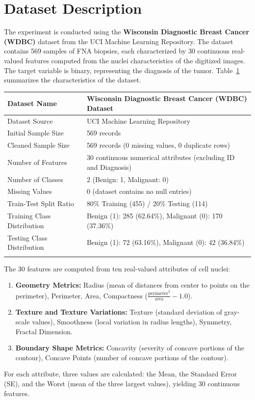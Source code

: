 \documentclass[12pt,a4paper]{article}
\begin{document}
\section{Dataset Description}
The experiment is conducted using the \textbf{Wisconsin Diagnostic Breast Cancer (WDBC)} dataset from the UCI Machine Learning Repository. The dataset contains 569 samples of FNA biopsies, each characterized by 30 continuous real-valued features computed from the nuclei characteristics of the digitized images. The target variable is binary, representing the diagnosis of the tumor. Table~\ref{tab:dataset_summary} summarizes the characteristics of the dataset.

\begin{longtable}{|p{6cm}|p{8cm}|}
\hline
Dataset Name & Wisconsin Diagnostic Breast Cancer (WDBC) Dataset \\ \hline
Dataset Source & UCI Machine Learning Repository \\ \hline
Initial Sample Size & 569 records \\ \hline
Cleaned Sample Size & 569 records (0 missing values, 0 duplicate rows) \\ \hline
Number of Features & 30 continuous numerical attributes (excluding ID and Diagnosis) \\ \hline
Number of Classes & 2 (Benign: 1, Malignant: 0) \\ \hline
Missing Values & 0 (dataset contains no null entries) \\ \hline
Train-Test Split Ratio & 80\% Training (455) / 20\% Testing (114) \\ \hline
Training Class Distribution & Benign (1): 285 (62.64\%), Malignant (0): 170 (37.36\%) \\ \hline
Testing Class Distribution & Benign (1): 72 (63.16\%), Malignant (0): 42 (36.84\%) \\ \hline
\label{tab:dataset_summary}
\end{longtable}

The 30 features are computed from ten real-valued attributes of cell nuclei:
\begin{enumerate}
    \item \textbf{Geometry Metrics:} Radius (mean of distances from center to points on the perimeter), Perimeter, Area, Compactness ($\frac{\text{perimeter}^2}{\text{area}} - 1.0$).
    \item \textbf{Texture and Texture Variations:} Texture (standard deviation of gray-scale values), Smoothness (local variation in radius lengths), Symmetry, Fractal Dimension.
    \item \textbf{Boundary Shape Metrics:} Concavity (severity of concave portions of the contour), Concave Points (number of concave portions of the contour).
\end{enumerate}
For each attribute, three values are calculated: the Mean, the Standard Error (SE), and the Worst (mean of the three largest values), yielding 30 continuous features.
\end{document}
